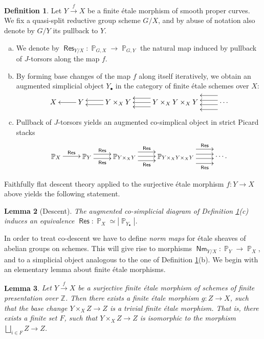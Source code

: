 \documentclass{article}
\DeclareMathOperator{\Pb}{\mathbb{P}}
\DeclareMathOperator{\Res}{\mathsf{Res}}
\DeclareMathOperator{\Nm}{\mathsf{Nm}}
\theoremstyle{definition}
\newtheorem{definition}{Definition}[section]
\theoremstyle{plain}
\newtheorem{lemma}[definition]{Lemma}
\begin{document}
\begin{definition}\label{defi:descent}
Let $Y \xrightarrow{f} X$ be a finite \'etale morphism of smooth proper curves. We fix a quasi-split reductive group scheme $G/X$, and by abuse of notation also denote by $G/Y$ its pullback to $Y$.
\begin{enumerate}[(a)]
\item We denote by $\Res_{Y/X}\colon \Pb_{G,X} \to \Pb_{G,Y}$ the natural map induced by pullback of $J$-torsors along the map $f$.
\item By forming base changes of the map $f$ along itself iteratively, we obtain an augmented simplicial object $Y_{\bullet}$ in the category of finite \'etale schemes over $X$:
\[
\xymatrix{
X & Y \ar[l] & Y\times_X Y \ar@<-0.7ex>[l] \ar@<0.7ex>[l] & Y \times_X Y \times_X Y \ar@<-1.4ex>[l] \ar[l] \ar@<1.4ex>[l] & \cdots \ar@<-0.7ex>[l] \ar@<0.7ex>[l] \ar@<-2.3ex>[l] \ar@<2.3ex>[l]  
}
\]
\item Pullback of $J$-torsors yields an augmented co-simplical object in strict Picard stacks
\[
\xymatrix{
\Pb_{X} & \Pb_{Y} \ar@{<-}[l]_{\Res} & \Pb_{Y\times_X Y} \ar@{<-}@<-0.7ex>[l]_-{\Res} \ar@{<-}@<0.7ex>[l]^-{\Res} & \Pb_{Y \times_X Y \times_X Y} \ar@{<-}@<-1.4ex>[l]_-{\Res} \ar@{<-}[l] \ar@{<-}@<1.4ex>[l]^-{\Res} & \cdots \ar@{<-}@<-0.7ex>[l] \ar@{<-}@<0.7ex>[l] \ar@{<-}@<-2.3ex>[l]_-{\Res} \ar@{<-}@<2.3ex>[l]^-{\Res}  .
}
\]
\end{enumerate}
\end{definition}

Faithfully flat descent theory applied to the surjective \'etale morphism $f\colon Y \to X$ above yields the following statement.

\begin{lemma}[Descent]\label{lemma:descent}
The augmented co-simplicial diagram of Definition \ref{defi:descent}(c) induces an equivalence $\Res\colon \Pb_X {\simeq} |\Pb_{Y_{\bullet}}|$.
\end{lemma}

In order to treat co-descent we have to define \emph{norm maps} for \'etale sheaves of abelian groups on schemes. This will give rise to morphisms $\Nm_{Y/X}\colon \Pb_Y \to \Pb_X$, and to a simplicial object analogous to the one of Definition \ref{defi:descent}(b).
We begin with an elementary lemma about finite \'etale morphisms.

\begin{lemma}\label{lemma:trivialisation}
Let $Y \xrightarrow{f} X$ be a surjective finite \'etale morphism of schemes of finite presentation over $\mathbb{Z}$. Then there exists a finite \'etale morphism $g\colon Z \to X$, such that the base change $Y \times_X Z \to Z$ is a trivial finite \'etale morphism. That is, there exists a finite set $F$, such that $Y \times_X Z \to Z$ is isomorphic to the morphism $\bigsqcup_{i \in F} Z \to Z$.
\end{lemma}
\end{document}
